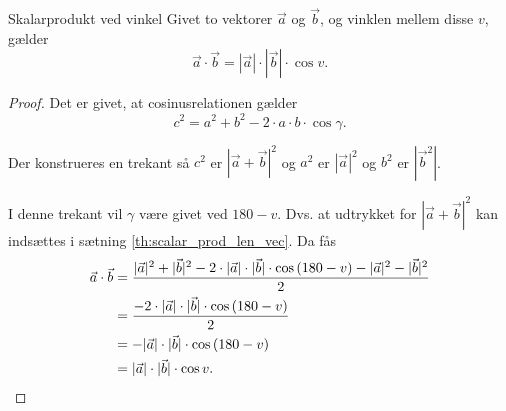 \documentclass{article}
\begin{document}
\begin{theorem}{Skalarprodukt ved vinkel}{}
	Givet to vektorer $\vec{a}$ og $\vec{b}$, og vinklen mellem disse $v$, gælder
	\[
		\vec{a} \cdot \vec{b} = |\vec{a}| \cdot |\vec{b}| \cdot \cos{v}.
	\] 
\end{theorem}
\begin{proof}
Det er givet, at cosinusrelationen gælder
\[
	c^2 = a^2 + b^2 - 2 \cdot a \cdot b \cdot \cos{\gamma}.
\] 
\begin{center}
\end{center}

Der konstrueres en trekant så $c^2$ er $|\vec{a} + \vec{b}|^2$ og $a^2$ er
$|\vec{a}|^2$ og $b^2$ er $|\vec{b}^2|$.
\smallskip

\begin{center}
\end{center}

I denne trekant vil $\gamma$ være givet ved $180 - v$. Dvs. at udtrykket for
$|\vec{a} + \vec{b}|^2$ kan indsættes i sætning \ref{th:scalar_prod_len_vec}.
Da fås
\begin{align*}
	\vec{a} \cdot \vec{b} &= \frac{|\vec{a}|^2 + |\vec{b}|^2 - 2 \cdot |\vec{a}| \cdot |\vec{b}| \cdot \cos{(180 - v)} - |\vec{a}|^2 - |\vec{b}|^2}{2}\\
						  &= \frac{- 2 \cdot |\vec{a}| \cdot |\vec{b}| \cdot \cos{(180 - v)}}{2}\\
						  &= -|\vec{a}| \cdot |\vec{b}| \cdot \cos{(180 - v)}\\
						  &= |\vec{a}| \cdot |\vec{b}| \cdot \cos{v}.\qedhere
\end{align*}
\end{proof}
\end{document}
